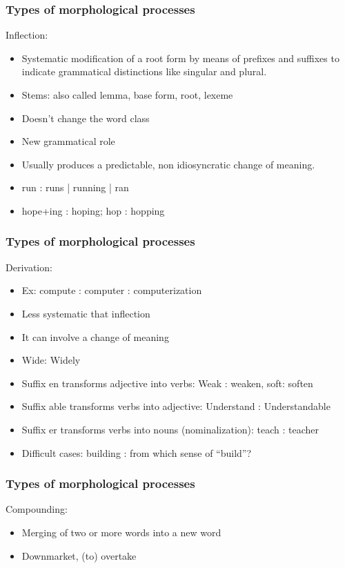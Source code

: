 \begin{frame}[fragile]
  \frametitle{Types of morphological processes}
  Inflection:
  \begin{itemize}
  \item Systematic modification of a root form by means  of prefixes and suffixes to indicate grammatical distinctions like singular and plural. 
  \item Stems: also called lemma, base form, root, lexeme
  \item Doesn't change the word class
  \item New grammatical role
  \item Usually produces a predictable, non idiosyncratic change of meaning. 
  \item run : runs | running | ran
  \item hope+ing : hoping;	hop : hopping

  \end{itemize}
\end{frame}

\begin{frame}[fragile]
  \frametitle{Types of morphological processes}
  Derivation:
  \begin{itemize}
  \item Ex: compute :  computer : computerization
  \item Less systematic that inflection
  \item It can involve a change of meaning
  \item Wide: Widely
  \item Suffix en transforms adjective into verbs: Weak : weaken, soft: soften
  \item Suffix able transforms verbs into adjective: Understand : Understandable
  \item Suffix er transforms verbs into nouns (nominalization): teach : teacher
  \item Difficult cases: building : from which sense of ``build''?
  \end{itemize}
\end{frame}

\begin{frame}[fragile]
  \frametitle{Types of morphological processes}
  Compounding:
  \begin{itemize}
  \item Merging of two or more words into a new word
  \item Downmarket, (to) overtake

  \end{itemize}
\end{frame}


